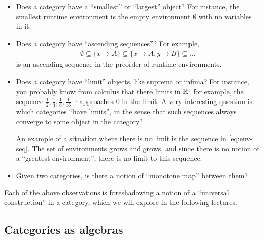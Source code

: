 \begin{itemize}
\item
  Does a category have a ``smallest'' or ``largest'' object?
  For instance, the smallest runtime environment is the empty environment $\emptyset$
  with no variables in it.
\item Does a category have ``ascending sequences''?
  For example, 
  \begin{align}
   \emptyset \subseteq \{x\mapsto A\} \subseteq \{x\mapsto A, y\mapsto B\} \subseteq \dots 
   \label{eq:env-seq}
  \end{align}
  is an ascending sequence in the preorder of runtime environments.
\item  Does a category have ``limit'' objects, like suprema or infima?  For
  instance, you probably know from calculus that there limits in \(\mathbb R\): for
  example, the sequence $\frac{1}{2}, \frac{1}{4}, \frac{1}{8},
  \frac{1}{16}\cdots$ approaches 0 in the limit.  A very interesting question is:
  which categories ``have limits'', in the sense that such sequences always
  converge to some object in the category?

  An example of a situation where there is no limit is the sequence in
  \cref{eq:env-seq}.  The set of environments grows and grows, and since there
  is no notion of a ``greatest environment'', there is no limit to this
  sequence.
\item
  Given two categories, is there a notion of ``monotone map'' between them?
\end{itemize}

Each of the above observations is foreshadowing a notion of a ``universal construction''
in a category, which we will explore in the following lectures.

\subsection{Categories as algebras}

